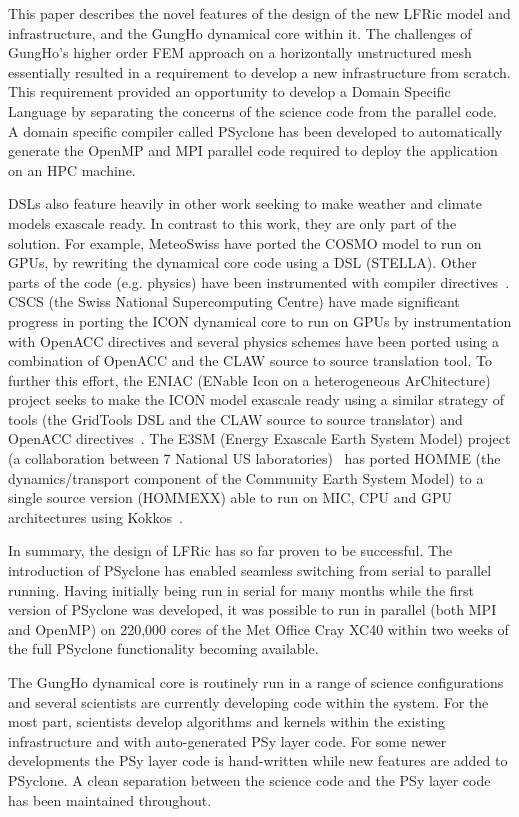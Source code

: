 \documentclass[review,times]{elsarticle}
\begin{document}
This paper describes the novel features of the design of the new LFRic
model and infrastructure, and the GungHo dynamical core within it. The
challenges of GungHo's higher order FEM approach on a horizontally
unstructured mesh essentially resulted in a requirement to develop a
new infrastructure from scratch. This requirement provided an
opportunity to develop a Domain Specific Language by separating the
concerns of the science code from the parallel code.  A domain
specific compiler called PSyclone has been developed to automatically
generate the OpenMP and MPI parallel code required to deploy the
application on an HPC machine.

DSLs also feature heavily in other work seeking to make weather and climate
models exascale ready. In contrast to this work, they are only part of the solution. For example,
MeteoSwiss have ported the COSMO model to run on GPUs, by
rewriting the dynamical core code using a DSL (STELLA). Other parts
of the code (e.g. physics) have been instrumented with compiler
directives~\cite{JSFI17}. CSCS (the Swiss National  Supercomputing
Centre) have made significant progress in porting the ICON dynamical
core to run on GPUs by instrumentation with OpenACC directives and
several physics schemes have been ported using a combination of
OpenACC and the CLAW source to source translation tool. To further
this effort, the ENIAC (ENable Icon on a heterogeneous ArChitecture)
project seeks to make the ICON model exascale ready using a similar
strategy of tools (the GridTools DSL and the CLAW source to source
translator) and OpenACC directives~\cite{ENIACDocs}.
The E3SM (Energy Exascale Earth System Model) project (a collaboration
between 7 National US laboratories)~\cite{E3SMDocs} has ported
HOMME (the dynamics/transport component of the Community Earth System
Model) to a single source version (HOMMEXX) able to run on MIC,
CPU and GPU architectures using Kokkos~\cite{KokkosGitHub}.

In summary, the design of LFRic has so far proven to be successful. The
introduction of PSyclone has enabled seamless switching from serial to
parallel running. Having initially being run in serial for many
months while the first version of PSyclone was developed, it was possible
to run in parallel (both MPI and OpenMP) on 220,000 cores of the Met Office
Cray XC40 within two weeks of the full PSyclone functionality
becoming available.

The GungHo dynamical core is routinely run in a range of science
configurations and several scientists are currently developing code within
the system. For the most part, scientists develop algorithms and kernels
within the existing infrastructure and with auto-generated PSy layer
code. For some newer developments the PSy layer code is hand-written
while new features are added to PSyclone. A clean separation between
the science code and the PSy layer code has been maintained
throughout. 
\end{document}
